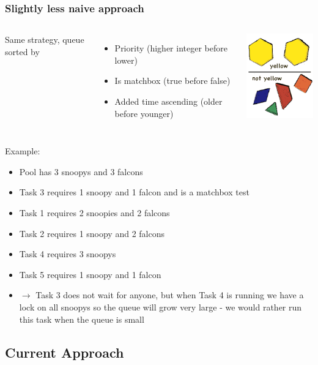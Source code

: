 \documentclass[xcolor=pdftex,dvipsnames,table]{beamer}
\begin{document}
\begin{frame}
\frametitle{Slightly less naive approach}
\begin{columns}[cc]
\column{2.0in}
Same strategy, queue sorted by
\begin{itemize}
  \item Priority (higher integer before lower)
  \item Is matchbox (true before false)
  \item Added time ascending (older before younger)
\end{itemize}
\column{0.5in}
\includegraphics[scale=0.50]{sort.png}
\end{columns}
\end{frame}

\begin{frame}
Example:
\begin{itemize}
  \item Pool has 3 snoopys and 3 falcons
  \item Task 3 requires 1 snoopy and 1 falcon and is a matchbox test
  \item Task 1 requires 2 snoopies and 2 falcons
  \item Task 2 requires 1 snoopy and 2 falcons
  \item Task 4 requires 3 snoopys
  \item Task 5 requires 1 snoopy and 1 falcon
  \item $\rightarrow$ Task 3 does not wait for anyone, but when Task 4
    is running we have a lock on all snoopys so the queue will grow
    very large - we would rather run this task when the queue is small
\end{itemize}
\end{frame}

\subsection{Current Approach}
\end{document}
